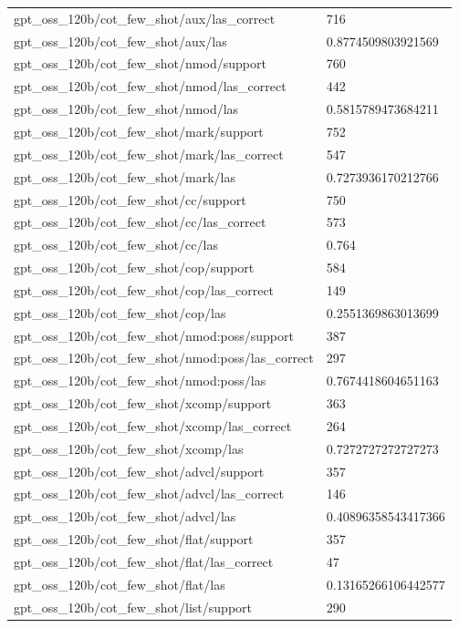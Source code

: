\begin{tabular}{ll}
gpt\_oss\_120b/cot\_few\_shot/aux/las\_correct & 716 \\
gpt\_oss\_120b/cot\_few\_shot/aux/las & 0.8774509803921569 \\
gpt\_oss\_120b/cot\_few\_shot/nmod/support & 760 \\
gpt\_oss\_120b/cot\_few\_shot/nmod/las\_correct & 442 \\
gpt\_oss\_120b/cot\_few\_shot/nmod/las & 0.5815789473684211 \\
gpt\_oss\_120b/cot\_few\_shot/mark/support & 752 \\
gpt\_oss\_120b/cot\_few\_shot/mark/las\_correct & 547 \\
gpt\_oss\_120b/cot\_few\_shot/mark/las & 0.7273936170212766 \\
gpt\_oss\_120b/cot\_few\_shot/cc/support & 750 \\
gpt\_oss\_120b/cot\_few\_shot/cc/las\_correct & 573 \\
gpt\_oss\_120b/cot\_few\_shot/cc/las & 0.764 \\
gpt\_oss\_120b/cot\_few\_shot/cop/support & 584 \\
gpt\_oss\_120b/cot\_few\_shot/cop/las\_correct & 149 \\
gpt\_oss\_120b/cot\_few\_shot/cop/las & 0.2551369863013699 \\
gpt\_oss\_120b/cot\_few\_shot/nmod:poss/support & 387 \\
gpt\_oss\_120b/cot\_few\_shot/nmod:poss/las\_correct & 297 \\
gpt\_oss\_120b/cot\_few\_shot/nmod:poss/las & 0.7674418604651163 \\
gpt\_oss\_120b/cot\_few\_shot/xcomp/support & 363 \\
gpt\_oss\_120b/cot\_few\_shot/xcomp/las\_correct & 264 \\
gpt\_oss\_120b/cot\_few\_shot/xcomp/las & 0.7272727272727273 \\
gpt\_oss\_120b/cot\_few\_shot/advcl/support & 357 \\
gpt\_oss\_120b/cot\_few\_shot/advcl/las\_correct & 146 \\
gpt\_oss\_120b/cot\_few\_shot/advcl/las & 0.40896358543417366 \\
gpt\_oss\_120b/cot\_few\_shot/flat/support & 357 \\
gpt\_oss\_120b/cot\_few\_shot/flat/las\_correct & 47 \\
gpt\_oss\_120b/cot\_few\_shot/flat/las & 0.13165266106442577 \\
gpt\_oss\_120b/cot\_few\_shot/list/support & 290 \\

\end{tabular}
